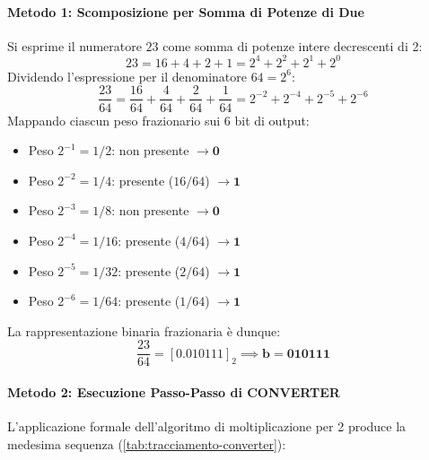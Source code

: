 \paragraph{Metodo 1: Scomposizione per Somma di Potenze di Due}
Si esprime il numeratore $23$ come somma di potenze intere decrescenti di 2:
\begin{equation}
  23 = 16 + 4 + 2 + 1 = 2^4 + 2^2 + 2^1 + 2^0
\end{equation}
Dividendo l'espressione per il denominatore $64 = 2^6$:
\begin{equation}
  \frac{23}{64} = \frac{16}{64} + \frac{4}{64} + \frac{2}{64} + \frac{1}{64} = 2^{-2} + 2^{-4} + 2^{-5} + 2^{-6}
\end{equation}
Mappando ciascun peso frazionario sui 6 bit di output:
\begin{itemize}
  \item Peso $2^{-1} = 1/2$: non presente $\longrightarrow \mathbf{0}$
  \item Peso $2^{-2} = 1/4$: presente ($16/64$) $\longrightarrow \mathbf{1}$
  \item Peso $2^{-3} = 1/8$: non presente $\longrightarrow \mathbf{0}$
  \item Peso $2^{-4} = 1/16$: presente ($4/64$) $\longrightarrow \mathbf{1}$
  \item Peso $2^{-5} = 1/32$: presente ($2/64$) $\longrightarrow \mathbf{1}$
  \item Peso $2^{-6} = 1/64$: presente ($1/64$) $\longrightarrow \mathbf{1}$
\end{itemize}
La rappresentazione binaria frazionaria \`e dunque:
\begin{equation}
  \frac{23}{64} = [0.010111]_2 \implies \mathbf{b = 010111}
\end{equation}

\paragraph{Metodo 2: Esecuzione Passo-Passo di CONVERTER}
L'applicazione formale dell'algoritmo di moltiplicazione per 2 produce la medesima sequenza (\autoref{tab:tracciamento-converter}):

